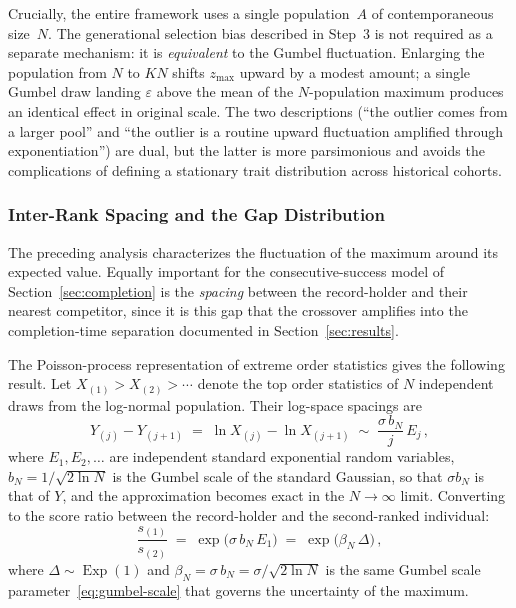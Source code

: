 \documentclass{article}
\begin{document}
Crucially, the entire framework uses a single population~$A$ of
contemporaneous size~$N$. The generational selection bias described in
Step~3 is not required as a separate mechanism: it is \emph{equivalent} to
the Gumbel fluctuation. Enlarging the population from $N$ to $KN$ shifts
$z_{\max}$ upward by a modest amount; a single Gumbel draw landing
$\varepsilon$ above the mean of the $N$-population maximum produces an
identical effect in original scale. The two descriptions (``the outlier
comes from a larger pool'' and ``the outlier is a routine upward fluctuation
amplified through exponentiation'') are dual, but the latter is more
parsimonious and avoids the complications of defining a stationary trait
distribution across historical cohorts.

\subsubsection{Inter-Rank Spacing and the Gap Distribution}
\label{ssec:gap}

The preceding analysis characterizes the fluctuation of the
maximum around its expected value. Equally important for the
consecutive-success model of Section~\ref{sec:completion} is the
\emph{spacing} between the record-holder and their nearest
competitor, since it is this gap that the crossover amplifies
into the completion-time separation documented in
Section~\ref{sec:results}.

The Poisson-process representation of extreme order statistics
\cite{resnick1987} gives the following result. Let
$X_{(1)} > X_{(2)} > \cdots$ denote the top order statistics of $N$
independent draws from the log-normal population. Their log-space
spacings are
\begin{equation}\label{eq:logspace-spacing}
  Y_{(j)} - Y_{(j+1)}
  \;=\;
  \ln X_{(j)} - \ln X_{(j+1)}
  \;\sim\;
  \frac{\sigma\, b_N}{j}\, E_j\,,
\end{equation}
where $E_1, E_2, \ldots$ are independent standard exponential random
variables, $b_N = 1/\sqrt{2\ln N}$ is the Gumbel scale of the standard Gaussian, so that $\sigma b_N$ is that of $Y$, and the approximation becomes exact in the $N \to
\infty$ limit. Converting to the score ratio between the
record-holder and the second-ranked individual:
\begin{equation}\label{eq:score-gap}
  \frac{s_{(1)}}{s_{(2)}}
  \;=\;
  \exp\!\bigl(\sigma\,b_N\, E_1\bigr)
  \;=\;
  \exp\!\bigl(\beta_N\, \Delta\bigr)\,,
\end{equation}
where $\Delta \sim \operatorname{Exp}(1)$ and
$\beta_N = \sigma\,b_N = \sigma/\sqrt{2\ln N}$ is the same Gumbel
scale parameter~\eqref{eq:gumbel-scale} that governs the uncertainty
of the maximum.
\end{document}
